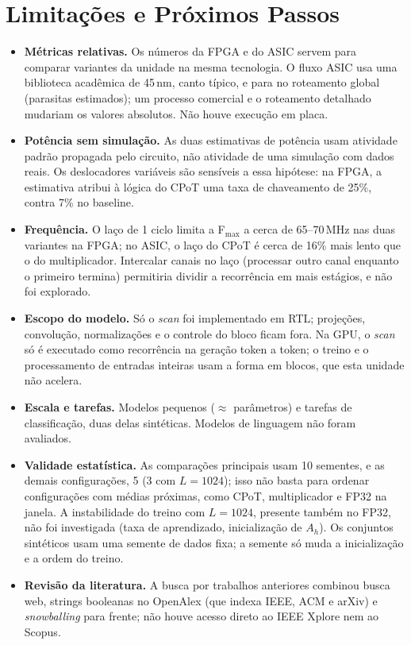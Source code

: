 \documentclass[12pt]{article}
\begin{document}
\section{Limitações e Próximos Passos}
\label{sec:limitacoes}

\begin{itemize}
  \item \textbf{Métricas relativas.} Os números da FPGA e do ASIC servem para comparar variantes da unidade na mesma tecnologia. O fluxo ASIC usa uma biblioteca acadêmica de 45\,nm, canto típico, e para no roteamento global (parasitas estimados); um processo comercial e o roteamento detalhado mudariam os valores absolutos. Não houve execução em placa.
  \item \textbf{Potência sem simulação.} As duas estimativas de potência usam atividade padrão propagada pelo circuito, não atividade de uma simulação com dados reais. Os deslocadores variáveis são sensíveis a essa hipótese: na FPGA, a estimativa atribui à lógica do CPoT uma taxa de chaveamento de 25\%, contra 7\% no baseline.
  \item \textbf{Frequência.} O laço de 1 ciclo limita a F$_{\max}$ a cerca de 65--70\,MHz nas duas variantes na FPGA; no ASIC, o laço do CPoT é cerca de 16\% mais lento que o do multiplicador. Intercalar canais no laço (processar outro canal enquanto o primeiro termina) permitiria dividir a recorrência em mais estágios, e não foi explorado.
  \item \textbf{Escopo do modelo.} Só o \emph{scan} foi implementado em RTL; projeções, convolução, normalizações e o controle do bloco ficam fora. Na GPU, o \emph{scan} só é executado como recorrência na geração token a token; o treino e o processamento de entradas inteiras usam a forma em blocos, que esta unidade não acelera.
  \item \textbf{Escala e tarefas.} Modelos pequenos ($\approx$\NParams{} parâmetros) e tarefas de classificação, duas delas sintéticas. Modelos de linguagem não foram avaliados.
  \item \textbf{Validade estatística.} As comparações principais usam 10 sementes, e as demais configurações, 5 (3 com $L=1024$); isso não basta para ordenar configurações com médias próximas, como CPoT, multiplicador e FP32 na janela. A instabilidade do treino com $L=1024$, presente também no FP32, não foi investigada (taxa de aprendizado, inicialização de $A_h$). Os conjuntos sintéticos usam uma semente de dados fixa; a semente só muda a inicialização e a ordem do treino.
  \item \textbf{Revisão da literatura.} A busca por trabalhos anteriores combinou busca web, strings booleanas no OpenAlex (que indexa IEEE, ACM e arXiv) e \emph{snowballing} para frente; não houve acesso direto ao IEEE Xplore nem ao Scopus.
\end{itemize}
\end{document}
